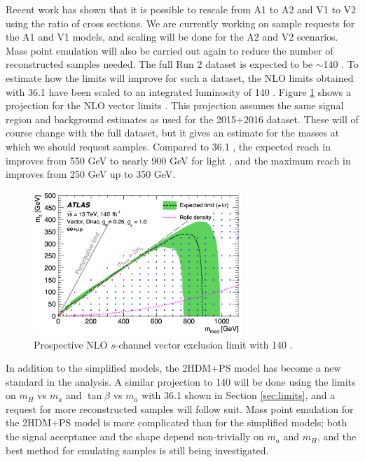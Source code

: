 \noindent Recent work \cite{ChrisA} has shown that it is possible to rescale from A1 to A2 and V1 to V2 using the ratio of cross sections. We are currently working on sample requests for the A1 and V1 models, and scaling will be done for the A2 and V2 scenarios. Mass point emulation will also be carried out again to reduce the number of reconstructed samples needed. The full Run 2 dataset is expected to be $\sim$140 \ifb. To estimate how the limits will improve for such a dataset, the NLO limits obtained with 36.1 \ifb have been scaled to an integrated luminosity of 140 \ifb. Figure \ref{fig:140limits} shows a projection for the NLO vector limits \cite{ChrisA}. This projection assumes the same signal region and background estimates as used for the 2015+2016 dataset. These will of course change with the full dataset, but it gives an estimate for the masses at which we should request samples. Compared to 36.1 \ifb, the expected reach in \mmed improves from 550 GeV to nearly 900 GeV for light \mchi, and the maximum reach in \mchi improves from 250 GeV up to 350 GeV.

\begin{figure}[!htb]
\centering
\includegraphics[width=0.7\textwidth]{Figures/140ifb.png}
\caption{Prospective NLO $s$-channel vector exclusion limit with 140 \ifb \cite{ChrisA}.}
\label{fig:140limits}
\end{figure}

In addition to the simplified models, the 2HDM+PS model has become a new standard in the analysis. A similar projection to 140 \ifb will be done using the limits on $m_H$ vs $m_a$ and $\tan \beta$ vs $m_a$ with 36.1 \ifb shown in Section \ref{sec:limits}, and a request for more reconstructed samples will follow suit. Mass point emulation for the 2HDM+PS model is more complicated than for the simplified models; both the signal acceptance and the \etmiss shape depend non-trivially on $m_a$ and $m_H$, and the best method for emulating samples is still being investigated.

